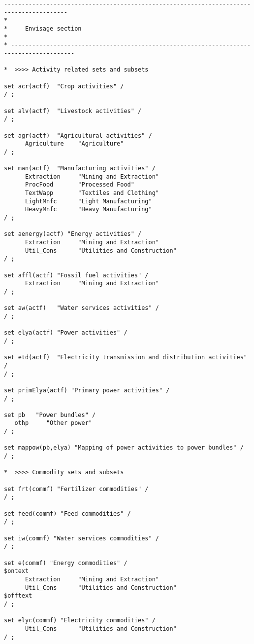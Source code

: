 \begin{lstlisting}[language=GAMS, caption={Sets for the \textsc{Envisage} Model aggregation}, label=lst:EnvSets]
 ----------------------------------------------------------------------------------------
*
*     Envisage section
*
* ----------------------------------------------------------------------------------------

*  >>>> Activity related sets and subsets

set acr(actf)  "Crop activities" /
/ ;

set alv(actf)  "Livestock activities" /
/ ;

set agr(actf)  "Agricultural activities" /
      Agriculture    "Agriculture"
/ ;

set man(actf)  "Manufacturing activities" /
      Extraction     "Mining and Extraction"
      ProcFood       "Processed Food"
      TextWapp       "Textiles and Clothing"
      LightMnfc      "Light Manufacturing"
      HeavyMnfc      "Heavy Manufacturing"
/ ;

set aenergy(actf) "Energy activities" /
      Extraction     "Mining and Extraction"
      Util_Cons      "Utilities and Construction"
/ ;

set affl(actf) "Fossil fuel activities" /
      Extraction     "Mining and Extraction"
/ ;

set aw(actf)   "Water services activities" /
/ ;

set elya(actf) "Power activities" /
/ ;

set etd(actf)  "Electricity transmission and distribution activities" /
/ ;

set primElya(actf) "Primary power activities" /
/ ;

set pb   "Power bundles" /
   othp     "Other power"
/ ;

set mappow(pb,elya) "Mapping of power activities to power bundles" /
/ ;

*  >>>> Commodity sets and subsets

set frt(commf) "Fertilizer commodities" /
/ ;

set feed(commf) "Feed commodities" /
/ ;

set iw(commf) "Water services commodities" /
/ ;

set e(commf) "Energy commodities" /
$ontext
      Extraction     "Mining and Extraction"
      Util_Cons      "Utilities and Construction"
$offtext
/ ;

set elyc(commf) "Electricity commodities" /
      Util_Cons      "Utilities and Construction"
/ ;


\end{lstlisting}
